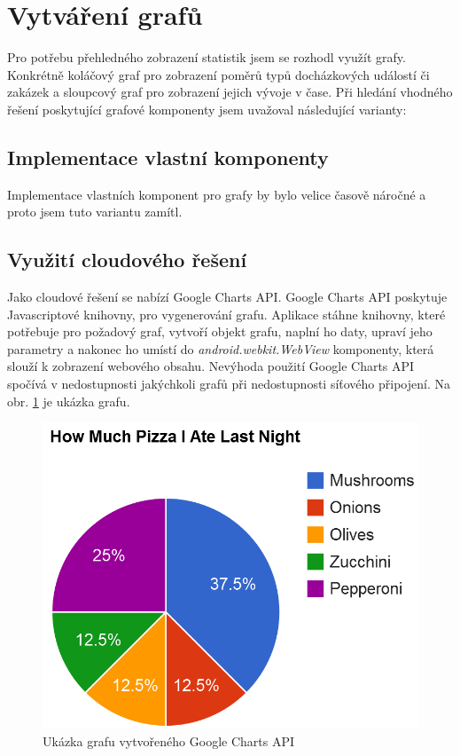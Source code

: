 \documentclass{diplomka}
\begin{document}
\section{Vytváření grafů}
Pro potřebu přehledného zobrazení statistik jsem se rozhodl využít grafy. Konkrétně koláčový graf pro zobrazení poměrů typů docházkových událostí či zakázek a sloupcový graf pro zobrazení jejich vývoje v čase. Při hledání vhodného řešení poskytující grafové komponenty jsem uvažoval následující varianty:

\subsection*{Implementace vlastní komponenty}
Implementace vlastních komponent pro grafy by bylo velice časově náročné a proto jsem tuto variantu zamítl.

\subsection*{Využití cloudového řešení}
Jako cloudové řešení se nabízí Google Charts API\cite{googlecharts}. Google Charts API poskytuje Javascriptové knihovny, pro vygenerování grafu. Aplikace stáhne knihovny, které potřebuje pro požadový graf, vytvoří objekt grafu, naplní ho daty, upraví jeho parametry a nakonec ho umístí do \emph{android.webkit.WebView} komponenty, která slouží k zobrazení webového obsahu. Nevýhoda použití Google Charts API spočívá v nedostupnosti jakýchkoli grafů při nedostupnosti síťového připojení. Na obr. \ref{fig:gcharts} je ukázka grafu.
\begin{figure}[H]
  \centering
  \includegraphics[scale=0.5]{obr/gcharts.png}
\caption{Ukázka grafu vytvořeného Google Charts API}
\label{fig:gcharts}
\end{figure}
\end{document}
